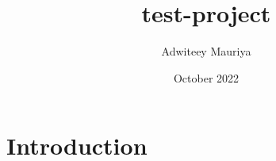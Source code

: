 \documentclass{article}
\title{test-project}
\author{Adwiteey Mauriya}
\date{October 2022}
\begin{document}
\maketitle

\section{Introduction}
\end{document}
